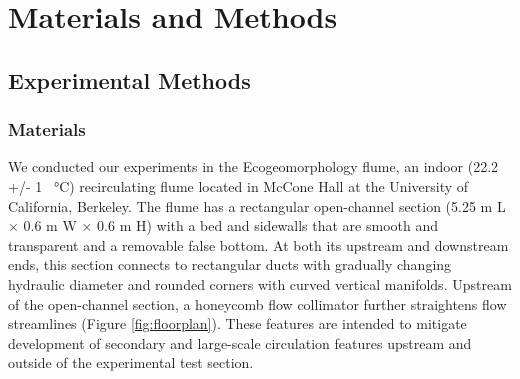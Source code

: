 \documentclass[geosciences,article,submit,moreauthors,pdftex]{Definitions/mdpi}
\begin{document}
\section{Materials and Methods}

\subsection{Experimental Methods}

\subsubsection{Materials}

We conducted our experiments in the Ecogeomorphology flume, an indoor (22.2 +/- 1 \SI{}{\celsius}) recirculating flume located in McCone Hall at the University of California, Berkeley. The flume has a rectangular open-channel section (5.25 m L $\times$ 0.6 m W $\times$ 0.6 m H) with a bed and sidewalls that are smooth and transparent and a removable false bottom. At both its upstream and downstream ends, this section connects to rectangular ducts with gradually changing hydraulic diameter and rounded corners with curved vertical manifolds. Upstream of the open-channel section, a honeycomb flow collimator further straightens flow streamlines (Figure \ref{fig:floorplan}). These features are intended to mitigate development of secondary and large-scale circulation features upstream and outside of the experimental test section. 
\end{document}
